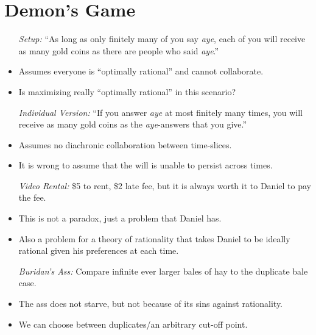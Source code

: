 \documentclass[a4paper, 11pt]{article} %
\begin{document}
\section*{Demon's Game}

\begin{itemize}
  \item[\it Setup:] ``As long as only finitely many of you say \textit{aye}, each of you will receive as many gold coins as there are people who said \textit{aye}.'' 
    \item Assumes everyone is ``optimally rational'' and cannot collaborate.
    \item Is maximizing really ``optimally rational'' in this scenario?
  \item[\it Individual Version:] ``If you answer \textit{aye} at most finitely many times, you will receive as many gold coins as the \textit{aye}-answers that you give.''
    \item Assumes no diachronic collaboration between time-slices. 
    \item It is wrong to assume that the will is unable to persist across times.
  \item[\it Video Rental:] \$5 to rent, \$2 late fee, but it is always worth it to Daniel to pay the fee.
    \item This is not a paradox, just a problem that Daniel has.
    \item Also a problem for a theory of rationality that takes Daniel to be ideally rational given his preferences at each time.
  \item[\it Buridan's Ass:] Compare infinite ever larger bales of hay to the duplicate bale case.
    \item The ass does not starve, but not because of its sins against rationality.
    \item We can choose between duplicates/an arbitrary cut-off point.
\end{itemize}
\end{document}
